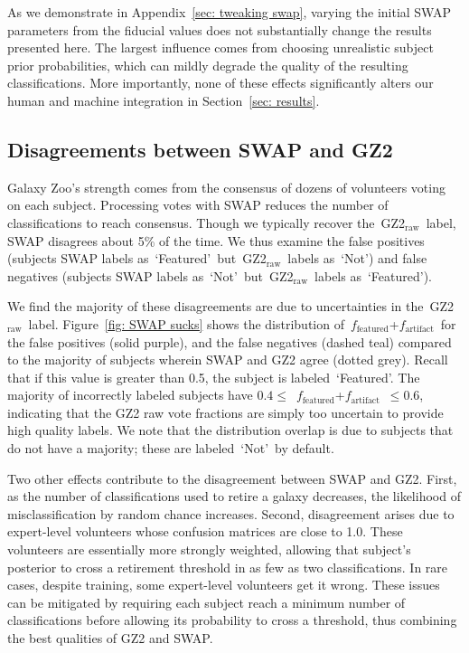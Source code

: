 \documentclass[twocolumn]{aastex6}
\newcommand{\feat}{`Featured'}
\newcommand{\notfeat}{`Not'}
\newcommand{\raw}{GZ2$_{\text{raw}}$}
\newcommand{\ffeat}{$f_{\mathrm{featured}}$}
\newcommand{\fstar}{$f_{\mathrm{artifact}}$}
\begin{document}
As we demonstrate in Appendix~\ref{sec: tweaking swap}, varying the initial SWAP 
parameters from the fiducial values does not substantially change the results 
presented here. The largest influence comes from choosing unrealistic subject 
prior probabilities, which can mildly degrade the quality of the resulting classifications. 
More importantly, none of these effects significantly alters our human and machine integration in Section~\ref{sec: results}. 



\subsection{Disagreements between SWAP and GZ2}
Galaxy Zoo's strength comes from the consensus of dozens of volunteers voting on each subject. 
Processing votes with SWAP reduces the number of classifications to reach consensus. 
Though we typically recover the~\raw~label, SWAP disagrees about 5\% of the time. 
We thus examine the false positives (subjects SWAP labels as~\feat~but~\raw~labels as~\notfeat) and false negatives (subjects SWAP labels as~\notfeat~but~\raw~labels as~\feat).

We find the majority of these disagreements are due to uncertainties in 
the~\raw~label. Figure~\ref{fig: SWAP sucks} shows the distribution of~\ffeat+\fstar~for the false positives (solid purple), and the false negatives (dashed teal) compared to the
majority of subjects wherein SWAP and GZ2 agree (dotted grey).  
Recall that if this value is greater than 0.5, the subject is labeled~\feat.  
The majority of incorrectly 
labeled subjects have $0.4 \le$~\ffeat+\fstar~$\le 0.6$, indicating that 
the GZ2 raw vote fractions are simply too uncertain to provide high quality labels. 
We note that the distribution overlap is due to subjects that do not have a majority;
these are labeled~\notfeat~by default. 

Two other effects contribute to the disagreement between SWAP and GZ2. 
First, as the number of classifications used to retire a galaxy decreases, the 
likelihood of misclassification by random chance increases. 
Second, disagreement arises due to expert-level volunteers whose confusion 
matrices are close to 1.0. These volunteers are essentially more 
strongly weighted, allowing that subject's posterior to cross a retirement threshold
in as few as two classifications. In rare cases, despite training, some expert-level 
volunteers get it wrong. These issues can be mitigated by requiring each subject reach 
a minimum number of classifications before allowing its probability to cross a 
threshold, thus combining the best qualities of GZ2 and SWAP. 
\end{document}
